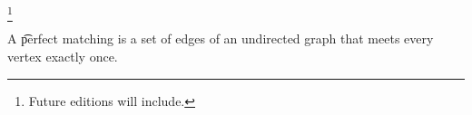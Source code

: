 
\footnote{Future editions will include.}


A \t{perfect matching} is a set of edges of an undirected graph that meets every vertex exactly once.

\blankpage
